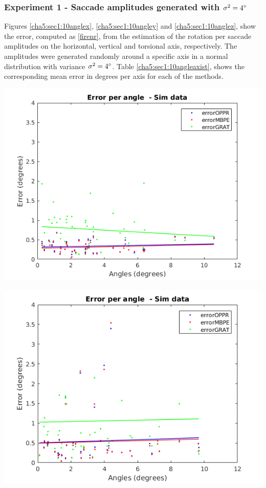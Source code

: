 \subsubsection{Experiment 1 - Saccade amplitudes generated with $\sigma^2 = 4 \degree $}
Figures \ref{cha5:sec1:10anglex}, \ref{cha5:sec1:10angley} and \ref{cha5:sec1:10anglez}, show the error, computed as \ref{firenr}, from the estimation of the rotation per saccade amplitudes on the horizontal, vertical and torsional axis, respectively. The amplitudes were generated randomly around a specific axis in a normal distribution with variance $\sigma^2 = 4 \degree$. Table \ref{cha5:sec1:10angleaxist}, shows the corresponding mean error in degrees per axis for each of the methods.\\

\begin{minipage}{0.33\textwidth}
	\centering
	\includegraphics[width=\textwidth]{images/sim/10anglex.png}
	\label{cha5:sec1:10anglex}
\end{minipage}
\begin{minipage}{0.33\textwidth}
	\centering
	\includegraphics[width=\textwidth]{images/sim/10angley.png}
	\label{cha5:sec1:10angley}
\end{minipage}
